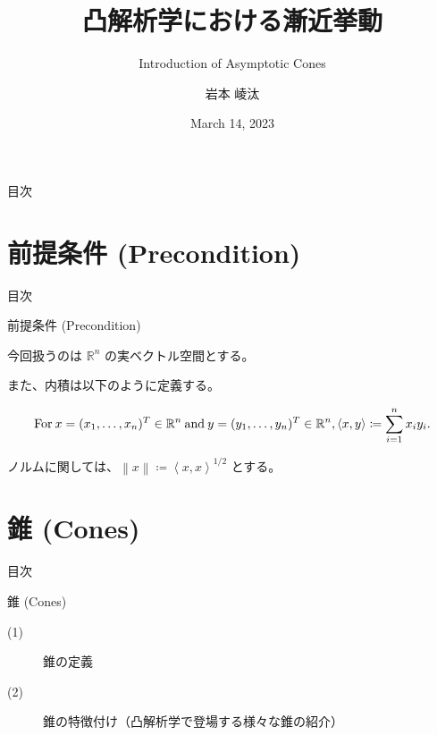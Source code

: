 \documentclass[aspectratio=169, dvipdfmx, 11pt]{beamer} %
\title[凸解析学における漸近挙動]{凸解析学における漸近挙動}
\subtitle{Introduction of Asymptotic Cones}
\author[岩本 崚汰]{岩本 崚汰}
\institute[新潟大学大学院]{新潟大学大学院自然科学研究科}
\date{March 14, 2023}
\begin{document}
\maketitle

\begin{frame}{目次}
    \tableofcontents
\end{frame}

\section{前提条件 (Precondition) }
\begin{frame}{目次}
    \tableofcontents[currentsection]
\end{frame}

\begin{frame}{前提条件 (Precondition) }

  今回扱うのは $\mathbb{R}^n$ の実ベクトル空間とする。

  また、内積は以下のように定義する。

  \begin{equation}
    \text{For}\: x=(x_1,\dots,x_n)^T \in \mathbb{R}^n \:\text{and}\: y=(y_1,\dots,y_n)^T \in \mathbb{R}^n, \left\langle x,y\right\rangle \coloneqq \sum_{i = 1}^{n} x_i y_i. \notag
  \end{equation}

  ノルムに関しては、$\left\lVert x \right\rVert \coloneqq \left\langle x,x\right\rangle ^{1/2} $ とする。

\end{frame}

\section{錐 (Cones) }
\begin{frame}{目次}
  \tableofcontents[currentsection]
\end{frame}

\begin{frame}{錐 (Cones) }
  \begin{description}
    \item[(1)] 錐の定義
    \item[(2)] 錐の特徴付け（凸解析学で登場する様々な錐の紹介）
  \end{description}
\end{frame}
\end{document}
